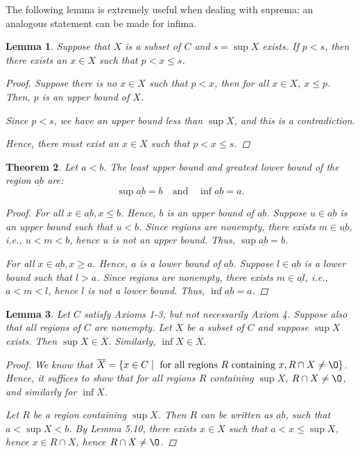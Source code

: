 \documentclass[11pt]{article}
\renewcommand{\emptyset}{\O}
\renewcommand{\_}[1]{\underline{ #1 }}
\newtheorem{theorem}{Theorem}[section]
\newtheorem{lemma}[theorem]{Lemma}
\theoremstyle{definition}
\numberwithin{equation}{subsection}
\begin{document}
The following lemma is extremely useful when dealing with suprema; an analogous statement can be made for infima.
\begin{lemma} 
\label{lem1}
Suppose that $X$ is a subset of $C$ and $s = \sup X$ exists.
If $p<s$, then there exists an $x\in X$ such that $p < x \le s$.

\begin{proof}
Suppose there is no $x \in X$ such that $p<x$, then for all $x \in X$, $x \leq p$. Then, $p$ is an upper bound of $X$.

Since $p<s$, we have an upper bound less than $\sup X$, and this is a contradiction.

Hence, there must exist an $x \in X$ such that $p<x\leq s$.


\renewcommand\qedsymbol{QED}
\end{proof}
\end{lemma} 


\begin{theorem}  Let $a < b$.  The least upper bound and greatest lower bound of the region $\_{ab}$ are:
\[
\sup \_{ab} = b \quad \text{and} \quad \inf \_{ab} = a.
\]

\begin{proof}
For all $x \in \_{ab}, x \leq b$. Hence, $b$ is an upper bound of $\_{ab}$. Suppose $u \in \_{ab}$ is an upper bound such that $u < b$. Since regions are nonempty, there exists $m \in \_{ub}$, i.e., $u<m<b$, hence $u$ is not an upper bound. Thus, $\sup \_{ab} = b$.

For all $x \in \_{ab}, x \geq a$. Hence, $a$ is a lower bound of $\_{ab}$. Suppose $l \in \_{ab}$ is a lower bound such that $l >a$. Since regions are nonempty, there exists $m \in \_{al}$, i.e., $a<m<l$, hence $l$ is not a lower bound. Thus, $\inf \_{ab} = a$.

\renewcommand\qedsymbol{QED}
\end{proof}
\end{theorem}




\begin{lemma}  Let $C$ satisfy Axioms 1-3, but not necessarily Axiom 4. Suppose also that all regions of  $C$ are nonempty.
Let $X$ be a subset  of $ C$ and suppose  $\sup X$ exists. Then $\sup X\in \overline{X}.$ Similarly, $\inf X\in \overline{X}.$
\begin{proof}
We know that $\overline{X} = \{x \in C \mid \text{ for all regions } R \text{ containing } x, R \cap X \neq \emptyset\}$. Hence, it suffices to show that for all regions $R$ containing $\sup X$, $R \cap X \neq \emptyset$, and similarly for $\inf X$.

Let $R$ be a region containing $\sup X$. Then $R$ can be written as $\_{ab}$, such that $a<\sup X<b$. By Lemma 5.10, there exists $x \in X$ such that $a<x\leq\sup X$, hence $x \in R \cap X$, hence $R \cap X \neq \emptyset$.

\renewcommand\qedsymbol{QED}
\end{proof}
\end{lemma} 
\end{document}
